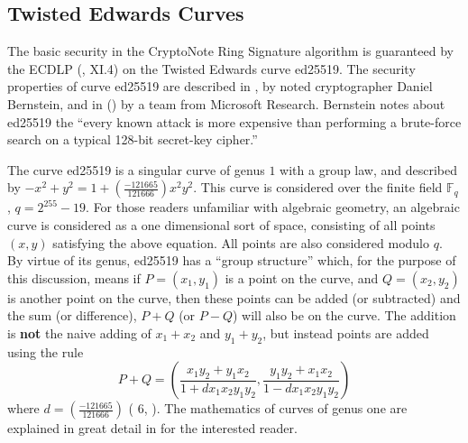 \documentclass[12pt,english]{mrl}
\numberwithin{equation}{section}
\numberwithin{figure}{section}
\begin{document}
\subsection{\label{sub:Twisted-Edwards-Curves}Twisted Edwards Curves}

The basic security in the CryptoNote Ring Signature algorithm is guaranteed
by the ECDLP (\cite{Si}, XI.4) on the Twisted Edwards curve ed25519.
The security properties of curve ed25519 are described in \cite{Bern},
by noted cryptographer Daniel Bernstein, and in (\cite{BCPM}) by
a team from Microsoft Research. Bernstein notes about ed25519 the ``every known
attack is more expensive than performing a brute-force search on a
typical 128-bit secret-key cipher.'' 

The curve ed25519 is a singular curve of genus $1$ with
a group law, and described by $-x^{2}+y^{2}=1+\left(\frac{-121665}{121666}\right)x^{2}y^{2}$.
This curve is considered over the finite field $\mathbb{F}_{q}$,
$q=2^{255}-19$. For those readers unfamiliar with algebraic geometry,
an algebraic curve is considered as a one dimensional sort of space, consisting
of all points $\left(x,y\right)$ satisfying the above equation. All
points are also considered modulo $q$. By virtue of its genus, ed25519
has a ``group structure'' which, for the purpose of this discussion, means if $P=\left(x_{1},y_{1}\right)$
is a point on the curve, and $Q=\left(x_{2},y_{2}\right)$ is another
point on the curve, then these points can be added (or subtracted) and the sum (or difference), $P+Q$ (or $P-Q$)
will also be on the curve. The addition is \textbf{not} the naive
adding of $x_{1}+x_{2}$ and $y_{1}+y_{2}$, but instead points are
added using the rule 
\[
P+Q=\left(\frac{x_{1}y_{2}+y_{1}x_{2}}{1+dx_{1}x_{2}y_{1}y_{2}},\frac{y_{1}y_{2}+x_{1}x_{2}}{1-dx_{1}x_{2}y_{1}y_{2}}\right)
\]
 where $d=\left(\frac{-121665}{121666}\right)$ (\cite{BBJLP} 6,
\cite{BCPM}). The mathematics of curves of genus one are explained
in great detail in \cite{Si} for the interested reader. 
\end{document}
